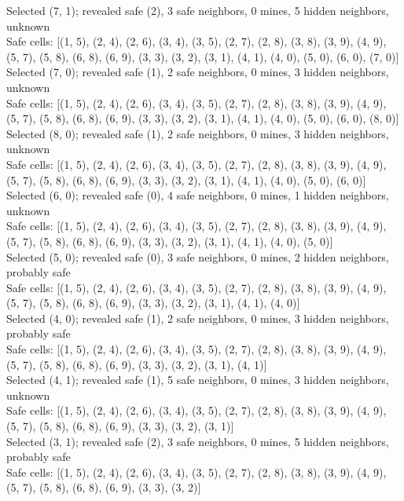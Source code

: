 \documentclass[11pt]{article} %
\begin{document}
Selected (7, 1); revealed safe (2), 3 safe neighbors, 0 mines, 5 hidden neighbors, unknown\\
Safe cells: [(1, 5), (2, 4), (2, 6), (3, 4), (3, 5), (2, 7), (2, 8), (3, 8), (3, 9), (4, 9), (5, 7), (5, 8), (6, 8), (6, 9), (3, 3), (3, 2), (3, 1), (4, 1), (4, 0), (5, 0), (6, 0), (7, 0)]\\
Selected (7, 0); revealed safe (1), 2 safe neighbors, 0 mines, 3 hidden neighbors, unknown\\
Safe cells: [(1, 5), (2, 4), (2, 6), (3, 4), (3, 5), (2, 7), (2, 8), (3, 8), (3, 9), (4, 9), (5, 7), (5, 8), (6, 8), (6, 9), (3, 3), (3, 2), (3, 1), (4, 1), (4, 0), (5, 0), (6, 0), (8, 0)]\\
Selected (8, 0); revealed safe (1), 2 safe neighbors, 0 mines, 3 hidden neighbors, unknown\\
Safe cells: [(1, 5), (2, 4), (2, 6), (3, 4), (3, 5), (2, 7), (2, 8), (3, 8), (3, 9), (4, 9), (5, 7), (5, 8), (6, 8), (6, 9), (3, 3), (3, 2), (3, 1), (4, 1), (4, 0), (5, 0), (6, 0)]\\
Selected (6, 0); revealed safe (0), 4 safe neighbors, 0 mines, 1 hidden neighbors, unknown\\
Safe cells: [(1, 5), (2, 4), (2, 6), (3, 4), (3, 5), (2, 7), (2, 8), (3, 8), (3, 9), (4, 9), (5, 7), (5, 8), (6, 8), (6, 9), (3, 3), (3, 2), (3, 1), (4, 1), (4, 0), (5, 0)]\\
Selected (5, 0); revealed safe (0), 3 safe neighbors, 0 mines, 2 hidden neighbors, probably safe\\
Safe cells: [(1, 5), (2, 4), (2, 6), (3, 4), (3, 5), (2, 7), (2, 8), (3, 8), (3, 9), (4, 9), (5, 7), (5, 8), (6, 8), (6, 9), (3, 3), (3, 2), (3, 1), (4, 1), (4, 0)]\\
Selected (4, 0); revealed safe (1), 2 safe neighbors, 0 mines, 3 hidden neighbors, probably safe\\
Safe cells: [(1, 5), (2, 4), (2, 6), (3, 4), (3, 5), (2, 7), (2, 8), (3, 8), (3, 9), (4, 9), (5, 7), (5, 8), (6, 8), (6, 9), (3, 3), (3, 2), (3, 1), (4, 1)]\\
Selected (4, 1); revealed safe (1), 5 safe neighbors, 0 mines, 3 hidden neighbors, unknown\\
Safe cells: [(1, 5), (2, 4), (2, 6), (3, 4), (3, 5), (2, 7), (2, 8), (3, 8), (3, 9), (4, 9), (5, 7), (5, 8), (6, 8), (6, 9), (3, 3), (3, 2), (3, 1)]\\
Selected (3, 1); revealed safe (2), 3 safe neighbors, 0 mines, 5 hidden neighbors, probably safe\\
Safe cells: [(1, 5), (2, 4), (2, 6), (3, 4), (3, 5), (2, 7), (2, 8), (3, 8), (3, 9), (4, 9), (5, 7), (5, 8), (6, 8), (6, 9), (3, 3), (3, 2)]\\
\end{document}
